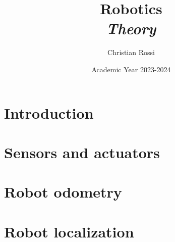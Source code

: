 \documentclass[12pt, a4paper]{report}
\title{Robotics \\ \textit{Theory}}
\author{Christian Rossi}
\date{Academic Year 2023-2024}
\begin{document}
    \maketitle

    

    \cleardoublepage{}

    \tableofcontents

    \cleardoublepage{}

    \chapter{Introduction}
    
    
    

    \chapter{Sensors and actuators}
    
    

    \chapter{Robot odometry}
    
        
        
        
      
      
      
      
      

    \chapter{Robot localization}
    
    
    
    
    
    
\end{document}
